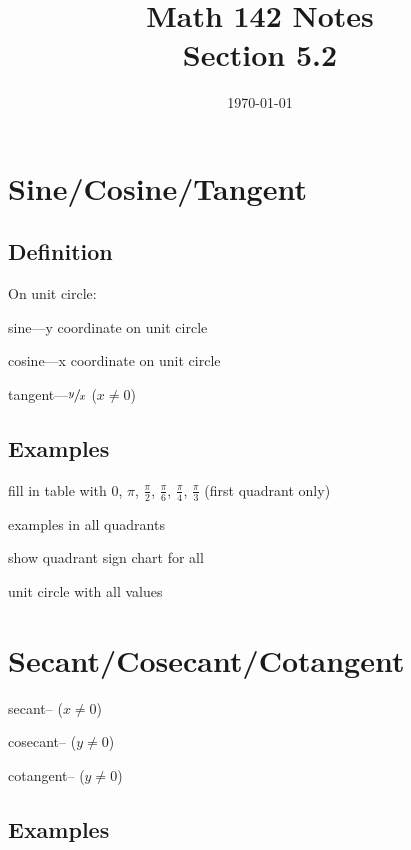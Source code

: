 \documentclass{exam}
\title{Math 142 Notes \\ Section 5.2}
\date{\today}
\begin{document}
  \maketitle
  \tableofcontents

  \section{Sine/Cosine/Tangent}

  \subsection{Definition}

  On unit circle:
  \begin{itemize*}
    \item sine---y coordinate on unit circle
    \item cosine---x coordinate on unit circle
    \item tangent---$\sfrac{y}{x}$ ($x \neq 0$)
  \end{itemize*}

  \subsection{Examples}

  \begin{itemize*}
    \item fill in table with 0, $\pi$, $\frac{\pi}{2}$, $\frac{\pi}{6}$, $\frac{\pi}{4}$, $\frac{\pi}{3}$ (first
      quadrant only)
    \item examples in all quadrants
    \item show quadrant sign chart for all
    \item unit circle with all values
  \end{itemize*}

  \section{Secant/Cosecant/Cotangent}
  \begin{itemize*}
    \item secant-- ($x \neq 0$)
    \item cosecant-- ($y \neq 0$)
    \item cotangent-- ($y \neq 0$)
  \end{itemize*}

  \subsection{Examples}
\end{document}
